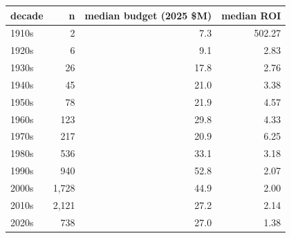 \begin{tabular}{lrrr}
\toprule
decade & n & median budget (2025 \$M) & median ROI \\
\midrule
1910s & 2 & 7.3 & 502.27 \\
1920s & 6 & 9.1 & 2.83 \\
1930s & 26 & 17.8 & 2.76 \\
1940s & 45 & 21.0 & 3.38 \\
1950s & 78 & 21.9 & 4.57 \\
1960s & 123 & 29.8 & 4.33 \\
1970s & 217 & 20.9 & 6.25 \\
1980s & 536 & 33.1 & 3.18 \\
1990s & 940 & 52.8 & 2.07 \\
2000s & 1{,}728 & 44.9 & 2.00 \\
2010s & 2{,}121 & 27.2 & 2.14 \\
2020s & 738 & 27.0 & 1.38 \\
\bottomrule
\end{tabular}
